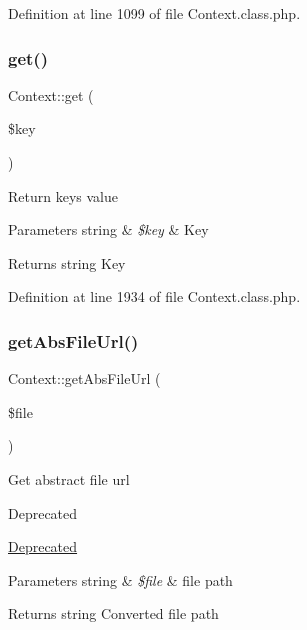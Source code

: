 Definition at line 1099 of file Context.\+class.\+php.

\mbox{\label{classContext_a90ce25d65fe6c9778421cbb36ab3def5}} 
\subsubsection{\texorpdfstring{get()}{get()}}
{\footnotesize\ttfamily Context\+::get (\begin{DoxyParamCaption}\item[{}]{\$key }\end{DoxyParamCaption})}

Return key\textquotesingle{}s value


\begin{DoxyParams}[1]{Parameters}
string & {\em \$key} & Key \\
\hline
\end{DoxyParams}
\begin{DoxyReturn}{Returns}
string Key 
\end{DoxyReturn}


Definition at line 1934 of file Context.\+class.\+php.

\mbox{\label{classContext_a217a7ff0e32178c6a2cc761de9c88998}} 
\subsubsection{\texorpdfstring{get\+Abs\+File\+Url()}{getAbsFileUrl()}}
{\footnotesize\ttfamily Context\+::get\+Abs\+File\+Url (\begin{DoxyParamCaption}\item[{}]{\$file }\end{DoxyParamCaption})}

Get abstract file url

\begin{DoxyRefDesc}{Deprecated}
\item[\hyperlink{deprecated__deprecated000003}{Deprecated}]\end{DoxyRefDesc}

\begin{DoxyParams}[1]{Parameters}
string & {\em \$file} & file path \\
\hline
\end{DoxyParams}
\begin{DoxyReturn}{Returns}
string Converted file path 
\end{DoxyReturn}


